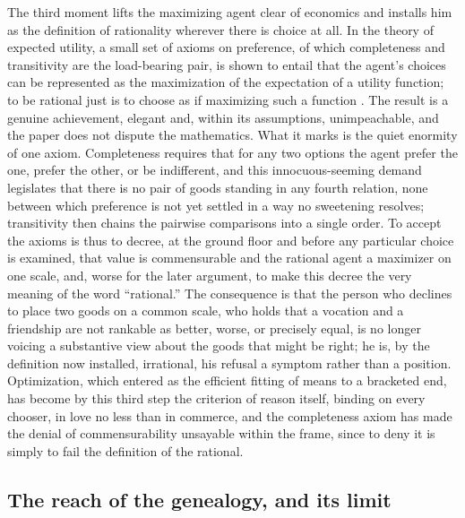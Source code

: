 The third moment lifts the maximizing agent clear of economics and installs him as the definition of rationality wherever there is choice at all. In the theory of expected utility, a small set of axioms on preference, of which completeness and transitivity are the load-bearing pair, is shown to entail that the agent's choices can be represented as the maximization of the expectation of a utility function; to be rational just is to choose as if maximizing such a function \parencite{vonneumann1944games,savage1954foundations}. The result is a genuine achievement, elegant and, within its assumptions, unimpeachable, and the paper does not dispute the mathematics. What it marks is the quiet enormity of one axiom. Completeness requires that for any two options the agent prefer the one, prefer the other, or be indifferent, and this innocuous-seeming demand legislates that there is no pair of goods standing in any fourth relation, none between which preference is not yet settled in a way no sweetening resolves; transitivity then chains the pairwise comparisons into a single order. To accept the axioms is thus to decree, at the ground floor and before any particular choice is examined, that value is commensurable and the rational agent a maximizer on one scale, and, worse for the later argument, to make this decree the very meaning of the word ``rational.'' The consequence is that the person who declines to place two goods on a common scale, who holds that a vocation and a friendship are not rankable as better, worse, or precisely equal, is no longer voicing a substantive view about the goods that might be right; he is, by the definition now installed, irrational, his refusal a symptom rather than a position. Optimization, which entered as the efficient fitting of means to a bracketed end, has become by this third step the criterion of reason itself, binding on every chooser, in love no less than in commerce, and the completeness axiom has made the denial of commensurability unsayable within the frame, since to deny it is simply to fail the definition of the rational.

\subsection*{The reach of the genealogy, and its limit}

